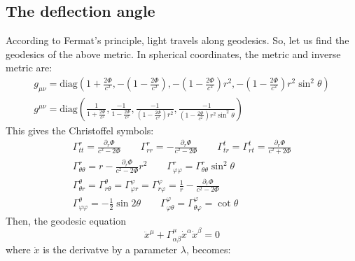 \documentclass{article}
\begin{document}
\subsection{The deflection angle}
According to Fermat's principle, light travels along geodesics. So, let us find the geodesics of the above metric. In spherical coordinates, the metric and inverse metric are:
\begin{equation}
\begin{gathered}
    g_{\mu\nu} = \text{diag}\left(1 + \frac{2\Phi}{c^2},
    -\left(1 - \frac{2\Phi}{c^2}\right),
    -\left(1 - \frac{2\Phi}{c^2}\right)r^2,
    -\left(1 - \frac{2\Phi}{c^2}\right)r^2\sin^2\theta\right)
    \\
    g^{\mu\nu} = \text{diag}\left(\frac{1}{1 + \frac{2\Phi}{c^2}}, \frac{-1}{1 - \frac{2\Phi}{c^2}}, \frac{-1}{\left(1 - \frac{2\Phi}{c^2}\right)r^2}, \frac{-1}{\left(1 - \frac{2\Phi}{c^2}\right)r^2\sin^2\theta}\right)
\end{gathered}
\end{equation}
This gives the Christoffel symbols:
\begin{equation}
\label{eq:christoffel}
\begin{gathered}
    \Gamma^r_{tt} = \frac{\partial_r \Phi}{c^2 - 2\Phi}
    \qquad
    \Gamma^r_{rr} = -\frac{\partial_r \Phi}{c^2 - 2\Phi}
    \qquad
    \Gamma^t_{tr} = \Gamma^t_{rt} = \frac{\partial_r \Phi}{c^2 + 2\Phi}
    \\
    \Gamma^r_{\theta\theta} = r - \frac{\partial_r \Phi}{c^2 - 2\Phi}r^2
    \qquad
    \Gamma^r_{\varphi\varphi} = \Gamma^r_{\theta\theta}\sin^2\theta
    \\
    \Gamma^\theta_{\theta r} = \Gamma^\theta_{r\theta} = \Gamma^\varphi_{\varphi r} = \Gamma^\varphi_{r\varphi} = \frac{1}{r} - \frac{\partial_r \Phi}{c^2 - 2\Phi}
    \\
    \Gamma^\theta_{\varphi\varphi} = -\frac{1}{2}\sin 2\theta
    \qquad
    \Gamma^\varphi_{\varphi\theta} = \Gamma^\varphi_{\theta\varphi} = \cot \theta
\end{gathered}
\end{equation}
Then, the geodesic equation
\begin{equation}
    \ddot{x}^\mu + \Gamma^{\mu}_{\alpha\beta}\dot{x}^\alpha\dot{x}^\beta = 0
\end{equation}
where $\dot{x}$ is the derivatve by a parameter $\lambda$, becomes:
\end{document}
